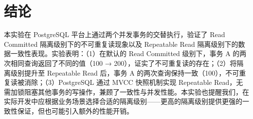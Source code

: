 \documentclass[12pt, a4paper]{academics}
\begin{document}
\section{结论}

本实验在 PostgreSQL 平台上通过两个并发事务的交替执行，验证了 Read Committed 隔离级别下的不可重复读现象以及 Repeatable Read 隔离级别下的数据一致性表现。实验表明：（1）在默认的 Read Committed 级别下，事务 A 的两次相同查询返回了不同的值（100 → 200），证实了不可重复读的存在；（2）将隔离级别提升至 Repeatable Read 后，事务 A 的两次查询保持一致（100），不可重复读被消除；（3）PostgreSQL 通过 MVCC 快照机制实现 Repeatable Read，无需加锁阻塞其他事务的写操作，兼顾了一致性与并发性能。本实验也提醒我们，在实际开发中应根据业务场景选择合适的隔离级别——更高的隔离级别提供更强的一致性保证，但也可能引入额外的性能开销。
\end{document}
